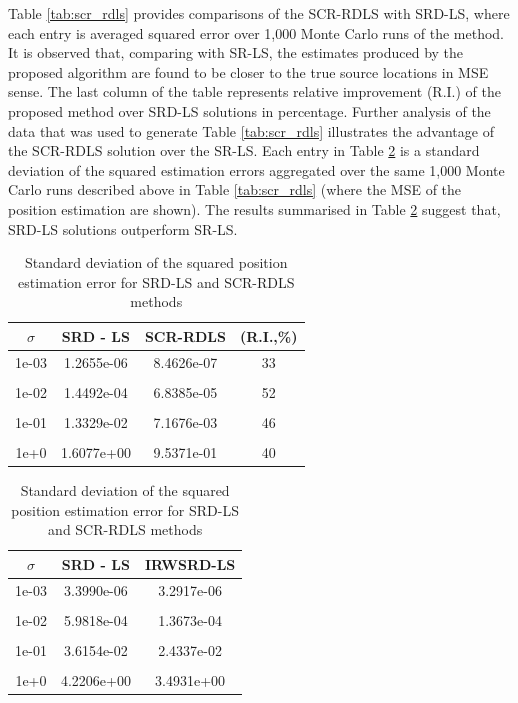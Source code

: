Table \ref{tab:scr_rdls}  provides comparisons of the SCR-RDLS with SRD-LS, where each entry is averaged squared error over 1,000 Monte Carlo runs of the method. %
 It is observed that, comparing with SR-LS, the estimates produced by the proposed algorithm are found to be closer to the true source locations in MSE sense. The last column of the table  represents relative improvement (R.I.) of the proposed method over SRD-LS solutions in percentage. Further analysis of the data that was used to generate Table \ref{tab:scr_rdls} illustrates the advantage of the SCR-RDLS solution over the SR-LS. 
Each entry in Table \ref{tab:rdls} is a standard deviation of the squared  estimation errors  aggregated over the  same 1,000 Monte Carlo runs described above in Table \ref{tab:scr_rdls} (where the MSE of the position estimation are shown). The results summarised in Table \ref{tab:rdls} suggest that, SRD-LS solutions outperform SR-LS.

\begin{table}[h]
\centering
\caption{MSE of position estimation for SRD-LS and SCR-RDLS methods}
\phantom{m}
\begin{tabular}{|c|c|c|c|} \hline
\centering
$\sigma$ & SRD - LS & SCR-RDLS & (R.I.,\%)  \\ \hline
1e-03&	1.2655e-06  & 8.4626e-07 &  33 \\ &&&\\
1e-02&	1.4492e-04 &  6.8385e-05 &  52 \\ &&&\\
1e-01&	1.3329e-02 & 7.1676e-03 &   46 \\ &&&\\
1e+0&	1.6077e+00 &  9.5371e-01 &   40  \\ %
\hline
\end{tabular}
\label{tab:scr_rdls}
\centering
\caption{Standard deviation of the squared position estimation error for SRD-LS and SCR-RDLS methods}
\phantom{m}
\begin{tabular}{|c|c|c|} \hline
$\sigma$ & SRD - LS & IRWSRD-LS  \\ \hline
1e-03&	3.3990e-06 &  3.2917e-06 \\ &&\\
1e-02&	5.9818e-04 &   1.3673e-04 \\ &&\\
1e-01&	3.6154e-02  & 2.4337e-02 \\ &&\\
1e+0&	4.2206e+00 &  3.4931e+00 \\ %
\hline
\end{tabular}
\label{tab:rdls}
\end{table}

\phantom{m}

